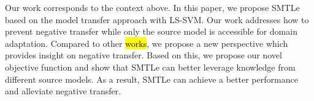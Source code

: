 Our work corresponds to the context above. In this paper, we propose SMTLe based on the model transfer approach with LS-SVM. Our work addresses how to prevent negative transfer while only the source model is accessible for domain adaptation. Compared to other \hl{works}, we propose a new perspective which provides insight on negative transfer. 
Based on this, we propose our novel objective function and show that SMTLe can better leverage knowledge from different source models. As a result, SMTLe can achieve a better performance and alleviate negative transfer.
